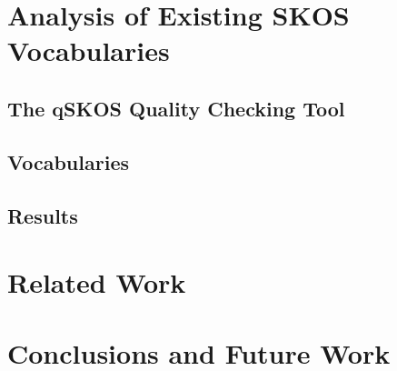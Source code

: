 \documentclass{llncs}
\begin{document}
\section{Analysis of Existing SKOS Vocabularies}

\subsection{The qSKOS Quality Checking Tool}

\subsection{Vocabularies}

\subsection{Results}

\section{Related Work}

\section{Conclusions and Future Work}



\end{document}
